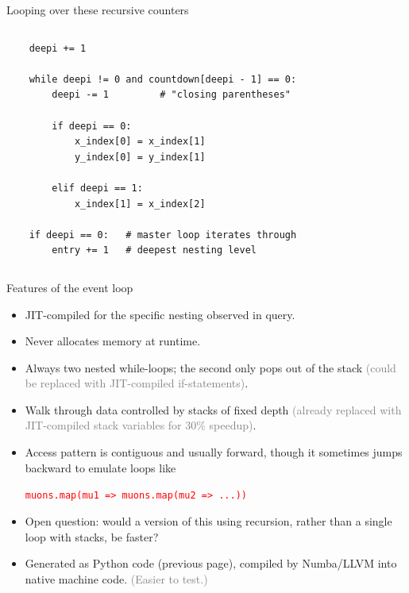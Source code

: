 \documentclass{beamer}
\begin{document}
\begin{frame}[fragile]{Looping over these recursive counters}
\begin{columns}[t]
\begin{verbatim}
    deepi += 1

    while deepi != 0 and countdown[deepi - 1] == 0:
        deepi -= 1         # "closing parentheses"

        if deepi == 0:
            x_index[0] = x_index[1]
            y_index[0] = y_index[1]

        elif deepi == 1:
            x_index[1] = x_index[2]

    if deepi == 0:   # master loop iterates through
        entry += 1   # deepest nesting level
\end{verbatim}
\end{columns}
\end{frame}

\begin{frame}{Features of the event loop}
\vspace{0.4 cm}
\begin{itemize}\setlength{\itemsep}{0.2 cm}
\item JIT-compiled for the specific nesting observed in query.
\item Never allocates memory at runtime.
\item Always two nested while-loops; the second only pops out of the stack \textcolor{gray}{(could be replaced with JIT-compiled if-statements)}.
\item Walk through data controlled by stacks of fixed depth \textcolor{gray}{(already replaced with JIT-compiled stack variables for 30\% speedup)}.
\item Access pattern is contiguous and usually forward, though it sometimes jumps backward to emulate loops like
\begin{center}
\textcolor{red}{\tt muons.map(mu1 => muons.map(mu2 => ...))}
\end{center}
\item Open question: would a version of this using recursion, rather than a single loop with stacks, be faster?
\item Generated as Python code (previous page), compiled by Numba/LLVM into native machine code. \textcolor{gray}{(Easier to test.)}
\end{itemize}
\end{frame}
\end{document}
